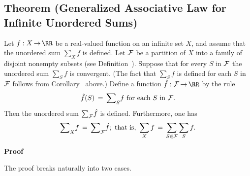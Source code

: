             \subsection{\small{\bf Theorem} (Generalized Associative Law for Infinite Unordered Sums)}
            \label{ThmG20.70}

\V

        Let $f:X \,{\rightarrow}\, {\RR}$ be a real-valued function on an infinite set $X$, and assume that the unordered sum $\sum_{X} f$ is defined.
    Let ${\cal F}$ be a partition of $X$ into a family of disjoint nonempty subsets (see Definition~).
        Suppose that for every $S$ in ${\cal F}$ the unordered sum ${\sum}_{S} f$ is convergent.
    (The fact that ${\sum}_{S} f$ is defined for each $S$ in ${\cal F}$ follows from Corollary~ above.)
    Define a function $\hat{f}:{\cal F} \,{\rightarrow}\, {\RR}$ by the rule
        \begin{displaymath}
        \hat{f}(S) \,=\, {\sum}_{S} f \mbox{ for each $S$ in ${\cal F}$}.
        \end{displaymath}
    Then the unordered sum ${\sum}_{{\cal F}} \hat{f}$ is defined.
    Furthermore, one has
        \begin{equation}
        \label{EqnG.20}
        {\sum}_{X} f \,=\, {\sum}_{{\cal F}} \hat{f}; \mbox{ that is, }
        \sum_{X} f  \,=\, \sum_{S{\in}{\cal F}} \sum_{S} f.
        \end{equation}

\V
        
        {\bf Proof}

\V

        The proof breaks naturally into two cases.

